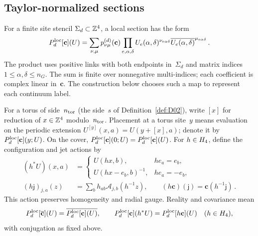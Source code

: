 \subsection{Taylor-normalized sections}\label{sec:A-sections}

\begin{definition}\label{def:D19}
For a finite site stencil $\Sigma_d\subset\mathbb{Z}^4$, a local section has the form
\begin{equation*}
P_{d}^{\mathrm{loc}}[\mathbf c](U)=
\sum_{\nu,\mu}p_{\nu\mu}^{(d)}(\mathbf c)
\prod_{e,\alpha,\delta}U_e(\alpha,\delta)^{\nu_{e\alpha\delta}}\overline{U_e(\alpha,\delta)}^{\mu_{e\alpha\delta}}\,.
\end{equation*}
The product uses positive links with both endpoints in~$\Sigma_d$ and matrix indices $1\le\alpha,\delta\le n_G$. The sum is finite over nonnegative multi-indices; each coefficient is complex linear in~$\mathbf c$. The construction below chooses such a map to represent each continuum label.
\end{definition}

For a torus of side~$n_{\rm tor}$ (the side~$s$ of Definition~\ref{def:D02}), write $[x]$ for reduction of $x\in\mathbb{Z}^4$ modulo~$n_{\rm tor}$. Placement at a torus site~$y$ means evaluation on the periodic extension $U^{[y]}(x,a)=U(y+[x],a)$; denote it by $P_{d}^{\mathrm{loc}}[\mathbf c](y;U)$. On the cover, $P_{d}^{\mathrm{loc}}[\mathbf c](0;U)=P_{d}^{\mathrm{loc}}[\mathbf c](U)$. For $h\in H_4$, define the configuration and jet actions by
\begin{align*}
(h^*U)(x,a)&=
\begin{cases}U(hx,b),&he_a=e_b,\\ U(hx-e_b,b)^{-1},&he_a=-e_b,\end{cases}\\
(h\mathsf j)_{j,a}(z)&=\sum_bh_{ab}\mathcal A_{j,b}(h^{-1}z),\qquad
(h\mathbf c)(\mathsf j)=\mathbf c(h^{-1}\mathsf j)\,.
\end{align*}
This action preserves homogeneity and radial gauge. Reality and covariance mean
\begin{equation*}
P_{d}^{\mathrm{loc}}[\overline{\mathbf c}](U)=\overline{P_{d}^{\mathrm{loc}}[\mathbf c](U)},\qquad
P_{d}^{\mathrm{loc}}[\mathbf c](h^*U)=P_{d}^{\mathrm{loc}}[h\mathbf c](U)\quad(h\in H_4),
\end{equation*}
with conjugation as fixed above.


